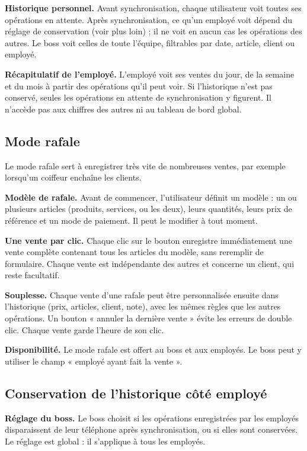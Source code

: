 \documentclass[11pt,a4paper]{article}
\newcommand{\fonc}[2]{\textbf{#1.} #2\par\vspace{0.2em}}
\begin{document}
	\fonc{Historique personnel}{Avant synchronisation, chaque utilisateur voit toutes ses opérations en attente. Après synchronisation, ce qu'un employé voit dépend du réglage de conservation (voir plus loin) ; il ne voit en aucun cas les opérations des autres. Le boss voit celles de toute l'équipe, filtrables par date, article, client ou employé.}

	\fonc{Récapitulatif de l'employé}{L'employé voit ses ventes du jour, de la semaine et du mois à partir des opérations qu'il peut voir. Si l'historique n'est pas conservé, seules les opérations en attente de synchronisation y figurent. Il n'accède pas aux chiffres des autres ni au tableau de bord global.}

	\subsection{Mode rafale}

	Le mode rafale sert à enregistrer très vite de nombreuses ventes, par exemple lorsqu'un coiffeur enchaîne les clients.

	\fonc{Modèle de rafale}{Avant de commencer, l'utilisateur définit un modèle : un ou plusieurs articles (produits, services, ou les deux), leurs quantités, leurs prix de référence et un mode de paiement. Il peut le modifier à tout moment.}

	\fonc{Une vente par clic}{Chaque clic sur le bouton enregistre immédiatement une vente complète contenant tous les articles du modèle, sans reremplir de formulaire. Chaque vente est indépendante des autres et concerne un client, qui reste facultatif.}

	\fonc{Souplesse}{Chaque vente d'une rafale peut être personnalisée ensuite dans l'historique (prix, articles, client, note), avec les mêmes règles que les autres opérations. Un bouton « annuler la dernière vente » évite les erreurs de double clic. Chaque vente garde l'heure de son clic.}

	\fonc{Disponibilité}{Le mode rafale est offert au boss et aux employés. Le boss peut y utiliser le champ « employé ayant fait la vente ».}

	\subsection{Conservation de l'historique côté employé}

	\fonc{Réglage du boss}{Le boss choisit si les opérations enregistrées par les employés disparaissent de leur téléphone après synchronisation, ou si elles sont conservées. Le réglage est global : il s'applique à tous les employés.}
\end{document}
